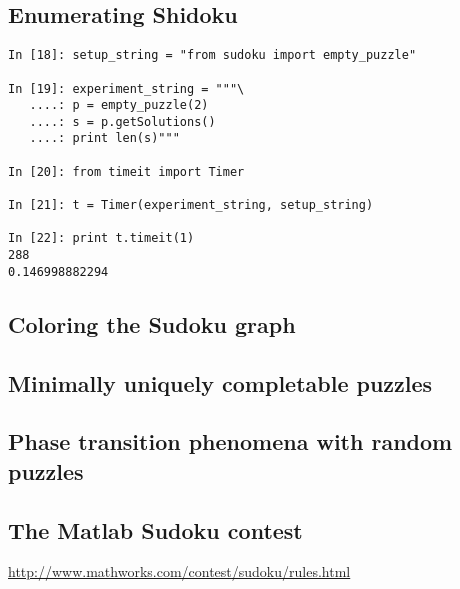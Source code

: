 \subsection{Enumerating Shidoku}
\label{sec:shidoku}

\begin{lstlisting}[caption=Enumerating Shidoku via constraint model]
In [18]: setup_string = "from sudoku import empty_puzzle"

In [19]: experiment_string = """\
   ....: p = empty_puzzle(2)
   ....: s = p.getSolutions()
   ....: print len(s)"""

In [20]: from timeit import Timer

In [21]: t = Timer(experiment_string, setup_string)

In [22]: print t.timeit(1)
288
0.146998882294
\end{lstlisting}

\subsection{Coloring the Sudoku graph}
\label{sec:coloring}

\subsection{Minimally uniquely completable puzzles}
\label{sec:minimal}

\subsection{Phase transition phenomena with random puzzles}
\label{sec:phase}

\cite{lewismetaheur}

\subsection{The Matlab Sudoku contest}
\label{sec:contest}

\url{http://www.mathworks.com/contest/sudoku/rules.html}

